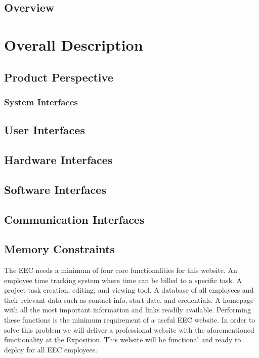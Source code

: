 \documentclass[letterpaper,10pt,titlepage,draftclsnofoot,onecolumn]{IEEEtran}
\begin{document}
\subsection{Overview}

\section{Overall Description}

\subsection{Product Perspective}

\subsubsection{System Interfaces}

\subsection{User Interfaces}

\subsection{Hardware Interfaces}

\subsection{Software Interfaces}

\subsection{Communication Interfaces}

\subsection{Memory Constraints}



The EEC needs a minimum of four core functionalities for this website. An employee time tracking system where time can be billed to a specific task. A project task creation, editing, and viewing tool. A database of all employees and their relevant data such as contact info, start date, and credentials. A homepage with all the most important information and links readily available. Performing these functions is the minimum requirement of a useful EEC website.\newline
In order to solve this problem we will deliver a professional website with the aforementioned functionality at the Exposition. This website will be functional and ready to deploy for all EEC employees.
\end{document}
